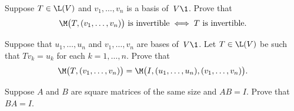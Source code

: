 \exercise
Suppose $T \in \L(V)$ and $v_1, \dots, v_n$ is a basis of~$V\1$.  Prove that
\[
\M\bigl(T, (v_1, \dots, v_n) \bigr) \text{ is invertible} \iff T \text{ is invertible}.
\]
\exercisedisplayend


\exercise
Suppose that $u_1, \dots, u_n$ and $v_1, \dots, v_n$ are bases of~$V\1$.  Let
$T \in \L(V)$ be such that $Tv_k = u_k$ for each
$k = 1, \dots, n$.  Prove that
\[
\M\bigl( T, (v_1, \dots, v_n) \bigr) =
\M\bigl(I, (u_1, \dots, u_n), (v_1, \dots, v_n)\bigr).
\]
\exercisedisplayend


\exercise
Suppose $A$ and $B$ are square matrices of the same size and $AB = I$. Prove that $BA = I$.


